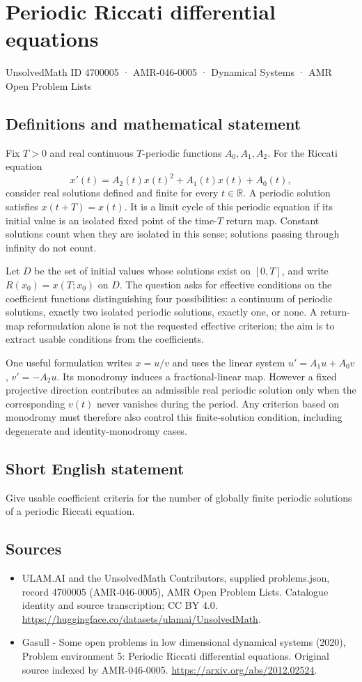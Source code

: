 \documentclass[11pt,a4paper]{article}
\begin{document}
\section*{Periodic Riccati differential equations}\label{4700005}
{\small UnsolvedMath ID 4700005 · AMR-046-0005 · Dynamical Systems · AMR Open Problem Lists}
\subsection{Definitions and mathematical statement}
Fix $T>0$ and real continuous $T$-periodic functions $A_0,A_1,A_2$.
For the Riccati equation
\[
 x'(t)=A_2(t)x(t)^2+A_1(t)x(t)+A_0(t),
\]
consider real solutions defined and finite for every $t\in\mathbb R$.
A periodic solution satisfies $x(t+T)=x(t)$. It is a limit cycle of this
periodic equation if its initial value is an isolated fixed point of the
time-$T$ return map. Constant solutions count when they are isolated in
this sense; solutions passing through infinity do not count.

Let $D$ be the set of initial values whose solutions exist on $[0,T]$, and
write $R(x_0)=x(T;x_0)$ on $D$. The question asks for effective conditions on
the coefficient functions distinguishing four possibilities: a continuum
of periodic solutions, exactly two isolated periodic solutions, exactly one,
or none. A return-map reformulation alone is not the requested effective
criterion; the aim is to extract usable conditions from the coefficients.

One useful formulation writes $x=u/v$ and uses the linear system
$u'=A_1u+A_0v$, $v'=-A_2u$. Its monodromy induces a fractional-linear map.
However a fixed projective direction contributes an admissible real periodic
solution only when the corresponding $v(t)$ never vanishes during the period.
Any criterion based on monodromy must therefore also control this
finite-solution condition, including degenerate and identity-monodromy cases.
\subsection{Short English statement}
Give usable coefficient criteria for the number of globally finite periodic solutions of a periodic Riccati equation.
\subsection{Sources}
\begin{itemize}
\item[S1] ULAM.AI and the UnsolvedMath Contributors, supplied problems.json, record 4700005 (AMR-046-0005), AMR Open Problem Lists. Catalogue identity and source transcription; CC BY 4.0.
\url{https://huggingface.co/datasets/ulamai/UnsolvedMath}.
\item[S2] Gasull - Some open problems in low dimensional dynamical systems (2020), Problem environment 5: Periodic Riccati differential equations. Original source indexed by AMR-046-0005.
\url{https://arxiv.org/abs/2012.02524}.
\end{itemize}
\end{document}

